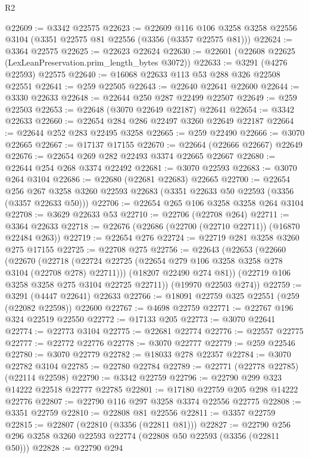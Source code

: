 \begin{lexlean}{R2}
\begin{coremodule}
@22609 := @3342 @22575
@22623 := @22609
    @116
    @106
    @3258
    @3258
    @22556
    @3104
    (@3351 @22575 @81 @22556 (@3356 (@3357 @22575 @81)))
@22624 := @3364 @22575
@22625 := @22623 @22624
@22630 := @22601 (@22608 @22625 (LexLeanPreservation.prim_length_bytes @3072))
@22633 := @3291 (@4276 @22593) @22575
@22640 := @16068 @22633 @113 @53 @288 @326 @22508 @22551
@22641 := @259 @22505
@22643 := @22640 @22641 @22600
@22644 := @3330 @22633
@22648 := @22644 @250 @287 @22499 @22507
@22649 := @259 @22503
@22653 := @22648 (@3070 @22649 @22187) @22641
@22654 := @3342 @22633
@22660 := @22654 @284 @286 @22497 @3260 @22649 @22187
@22664 := @22644 @252 @283 @22495 @3258
@22665 := @259 @22490
@22666 := @3070 @22665
@22667 := @17137 @17155
@22670 := @22664 (@22666 @22667) @22649
@22676 := @22654 @269 @282 @22493 @3374 @22665 @22667
@22680 := @22644 @254 @268 @3374 @22492
@22681 := @3070 @22593
@22683 := @3070 @264 @3104
@22686 := @22680 (@22681 @22683) @22665
@22700 := @22654
    @256
    @267
    @3258
    @3260
    @22593
    @22683
    (@3351 @22633 @50 @22593 (@3356 (@3357 @22633 @50)))
@22706 := @22654 @265 @106 @3258 @3258 @264 @3104
@22708 := @3629 @22633 @53
@22710 := @22706 (@22708 @264)
@22711 := @3364 @22633
@22718 := @22676 (@22686 (@22700 (@22710 @22711)) (@16870 @22484 @263))
@22719 := @22654 @276
@22724 := @22719 @281 @3258 @3260 @275 @17155
@22725 := @22708 @275
@22756 := @22643
    (@22653
      (@22660
        (@22670
          (@22718 (@22724 @22725 (@22654 @279 @106 @3258 @3258 @278 @3104 (@22708 @278) @22711)))
          (@18207 @22490 @274 @81))
        (@22719 @106 @3258 @3258 @275 @3104 @22725 @22711))
      (@19970 @22503 @274))
@22759 := @3291 (@4447 @22641) @22633
@22766 := @18091 @22759 @325 @22551 (@259 (@22082 @22598)) @22600
@22767 := @4698 @22759
@22771 := @22767 @196 @324 @22519 @22550
@22772 := @17133 @205
@22773 := @3070 @22641
@22774 := @22773 @3104
@22775 := @22681 @22774
@22776 := @22557 @22775
@22777 := @22772 @22776
@22778 := @3070 @22777
@22779 := @259 @22546
@22780 := @3070 @22779
@22782 := @18033 @278 @22357
@22784 := @3070 @22782 @3104
@22785 := @22780 @22784
@22789 := @22771 (@22778 @22785) (@22114 @22598)
@22790 := @3342 @22759
@22796 := @22790 @299 @323 @14222 @22518 @22777 @22785
@22801 := @17180 @22759 @205 @298 @14222 @22776
@22807 := @22790 @116 @297 @3258 @3374 @22556 @22775
@22808 := @3351 @22759
@22810 := @22808 @81 @22556
@22811 := @3357 @22759
@22815 := @22807 (@22810 (@3356 (@22811 @81)))
@22827 := @22790 @256 @296 @3258 @3260 @22593 @22774 (@22808 @50 @22593 (@3356 (@22811 @50)))
@22828 := @22790 @294

\end{coremodule}
\end{lexlean}
